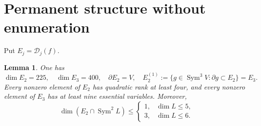 \documentclass[11pt]{amsart}
\newtheorem{lemma}[theorem]{Lemma}
\theoremstyle{remark}\newtheorem{remark}[theorem]{Remark}
\numberwithin{equation}{section}
\newcommand{\Sym}{\operatorname{Sym}}
\newcommand{\cD}{\mathcal D}
\newcommand{\dd}{\partial}
\begin{document}
\section{Permanent structure without enumeration}
Put $E_j=\cD_j(f)$.
\begin{lemma}\label{lem:permanent}
One has
\[
 \dim E_2=225,\quad \dim E_3=400,\quad \dd E_2=V,\quad
 E_2^{(1)}:=\{g\in\Sym^3V:\dd g\subset E_2\}=E_3.
\]
Every nonzero element of $E_2$ has quadratic rank at least four, and every
nonzero element of $E_3$ has at least nine essential variables. Moreover,
\begin{equation}\label{eq:intersection}
 \dim(E_2\cap\Sym^2L)\le
 \begin{cases}1,&\dim L\le5,\\3,&\dim L\le6.\end{cases}
\end{equation}
\end{lemma}
\end{document}

